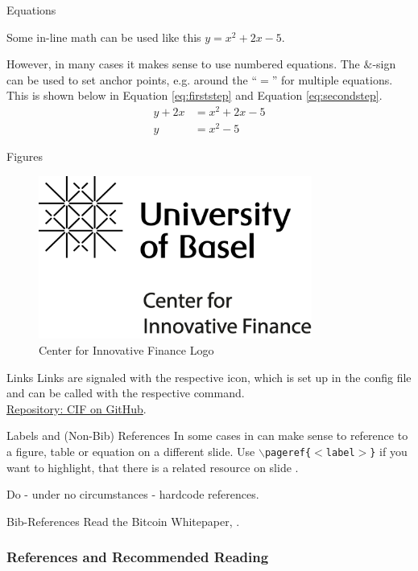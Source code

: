 \documentclass[handout]{beamer}
\begin{document}


\begin{frame}{Equations}

Some in-line math can be used like this $y=x^2+2x-5$. \\ \vspace{1em}

However, in many cases it makes sense to use numbered equations. The $\&$-sign can be used to set anchor points, e.g. around the ``$=$'' for multiple equations. This is shown below in Equation \eqref{eq:firststep} and Equation \eqref{eq:secondstep}.
	\begin{align}
		y + 2x &= x^2+2x-5 \label{eq:firststep}\\
		y &= x^2-5 \label{eq:secondstep}
	\end{align}
\end{frame}

\begin{frame}{Figures}
	\begin{figure}
		\center
		\includegraphics[width=0.8\textwidth]{../config/logo_cif}	
		\caption{Center for Innovative Finance Logo}
		\label{fig:logo}
	\end{figure}
\end{frame}

\begin{frame}{Links}
		Links are signaled with the respective icon, which is set up in the config file and can be called with the respective command.\\
		
		\link \href{https://github.com/cifunibas}{Repository: CIF on GitHub}.
		
\end{frame}


\begin{frame}{Labels and (Non-Bib) References}
	In some cases in can make sense to reference to a figure, table or equation on a different slide. Use \texttt{$\backslash$pageref\{$<$label$>$\}} if you want to highlight, that there is a related resource on slide \pageref{fig:logo}.\\ \vspace{1em}
	
	Do - under no circumstances - hardcode references.	
\end{frame}

\begin{frame}{Bib-References}
		Read the Bitcoin Whitepaper, \cite{nakamotoBitcoin2008}.
\end{frame}

\begin{frame}%
\frametitle{References and Recommended Reading}
	
	
\end{frame}
\end{document}
